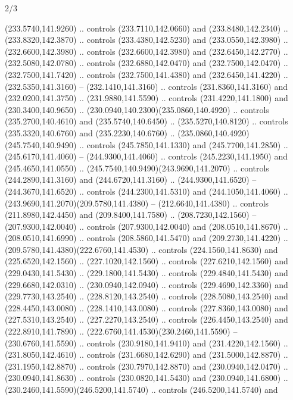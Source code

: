 \begin{flagdescription}{2/3}
\begin{scope}[xshift=0.5\flaglength,yshift=0.5\flagwidth,scale=\flagwidth/259.2]
\begin{scope}[y=0.8pt, x=0.8pt, yscale=-1,shift={(-243,-162)}]
      (233.5740,141.9260) .. controls (233.7110,142.0660) and (233.8480,142.2340) ..
      (233.8320,142.3870) .. controls (233.4380,142.5230) and (233.0550,142.3980) ..
      (232.6600,142.3980) .. controls (232.6600,142.3980) and (232.6450,142.2770) ..
      (232.5080,142.0780) .. controls (232.6880,142.0470) and (232.7500,142.0470) ..
      (232.7500,141.7420) .. controls (232.7500,141.4380) and (232.6450,141.4220) ..
      (232.5350,141.3160) -- (232.1410,141.3160) .. controls (231.8360,141.3160) and
      (232.0200,141.3750) .. (231.9880,141.5590) .. controls (231.4220,141.1800) and
      (230.3400,140.9650) .. (230.0940,140.2300)(235.0860,140.4920) .. controls
      (235.2700,140.4610) and (235.5740,140.6450) .. (235.5270,140.8120) .. controls
      (235.3320,140.6760) and (235.2230,140.6760) ..
      (235.0860,140.4920)(245.7540,140.9490) .. controls (245.7850,141.1330) and
      (245.7700,141.2850) .. (245.6170,141.4060) -- (244.9300,141.4060) .. controls
      (245.2230,141.1950) and (245.4650,141.0550) ..
      (245.7540,140.9490)(243.9690,141.2070) .. controls (244.2890,141.3160) and
      (244.6720,141.3160) .. (244.9300,141.6520) -- (244.3670,141.6520) .. controls
      (244.2300,141.5310) and (244.1050,141.4060) ..
      (243.9690,141.2070)(209.5780,141.4380) -- (212.6640,141.4380) .. controls
      (211.8980,142.4450) and (209.8400,141.7580) .. (208.7230,142.1560) --
      (207.9300,142.0040) .. controls (207.9300,142.0040) and (208.0510,141.8670) ..
      (208.0510,141.6990) .. controls (208.5860,141.5470) and (209.2730,141.4220) ..
      (209.5780,141.4380)(222.6760,141.4530) .. controls (224.1560,141.8630) and
      (225.6520,142.1560) .. (227.1020,142.1560) .. controls (227.6210,142.1560) and
      (229.0430,141.5430) .. (229.1800,141.5430) .. controls (229.4840,141.5430) and
      (229.6680,142.0310) .. (230.0940,142.0940) .. controls (229.4690,142.3360) and
      (229.7730,143.2540) .. (228.8120,143.2540) .. controls (228.5080,143.2540) and
      (228.4450,143.0080) .. (228.1410,143.0080) .. controls (227.8360,143.0080) and
      (227.5310,143.2540) .. (227.2270,143.2540) .. controls (226.4450,143.2540) and
      (222.8910,141.7890) .. (222.6760,141.4530)(230.2460,141.5590) --
      (230.6760,141.5590) .. controls (230.9180,141.9410) and (231.4220,142.1560) ..
      (231.8050,142.4610) .. controls (231.6680,142.6290) and (231.5000,142.8870) ..
      (231.1950,142.8870) .. controls (230.7970,142.8870) and (230.0940,142.0470) ..
      (230.0940,141.8630) .. controls (230.0820,141.5430) and (230.0940,141.6800) ..
      (230.2460,141.5590)(246.5200,141.5740) .. controls (246.5200,141.5740) and

\end{scope}
\end{scope}
\end{flagdescription}
